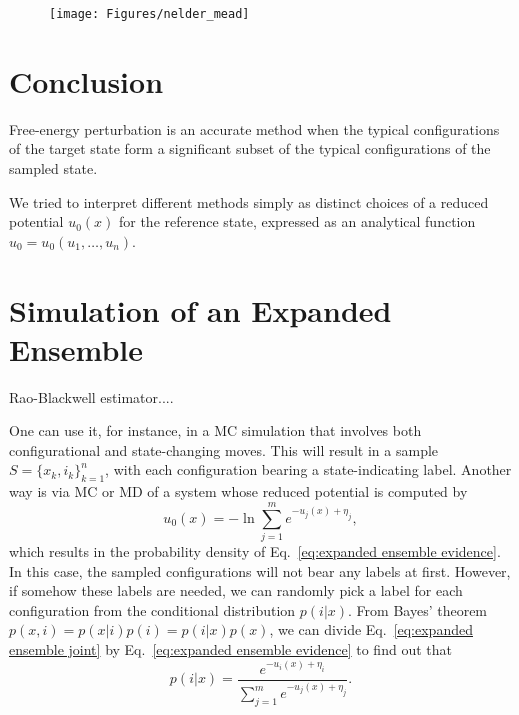 \documentclass[aip,jcp,reprint,amsmath,amssymb]{revtex4-1}
\begin{document}
\begin{figure}
\centering
\texttt{[image: Figures/nelder\_mead]}
\caption{}
\label{fig:nelder_mead}
\end{figure}


\section{Conclusion}

Free-energy perturbation is an accurate method when the typical configurations of the target state form a significant subset of the typical configurations of the sampled state.

We tried to interpret different methods simply as distinct choices of a reduced potential $u_0(x)$ for the reference state, expressed as an analytical function $u_0 = u_0(u_1,\dots,u_n)$.

\appendix

\section{Simulation of an Expanded Ensemble}
\label{sec:expanded ensemble simulation}

Rao-Blackwell estimator\cite{Ding_2017}....

One can use it, for instance, in a MC simulation that involves both configurational and state-changing moves.\cite{Lyubartsev_1992} This will result in a sample $S = \{x_k,i_k\}_{k=1}^n$, with each configuration bearing a state-indicating label. Another way is via MC or MD of a system whose reduced potential is computed by
\begin{equation}
u_0(x) = - \ln \sum_{j=1}^m e^{-u_j(x) + \eta_j},
\end{equation}
which results in the probability density of Eq.~\eqref{eq:expanded ensemble evidence}. In this case, the sampled configurations will not bear any labels at first. However, if somehow these labels are needed, we can randomly pick a label for each configuration from the conditional distribution $p(i|x)$.\cite{Nymeyer_2010} From Bayes' theorem $p(x,i) = p(x|i) p(i) = p(i|x) p(x)$, we can divide Eq.~\eqref{eq:expanded ensemble joint} by Eq.~\eqref{eq:expanded ensemble evidence} to find out that
\begin{equation}
p(i|x) = \frac{e^{-u_i(x) + \eta_i}}{\sum_{j=1}^m e^{-u_j(x) + \eta_j}}.
\end{equation}
\end{document}
